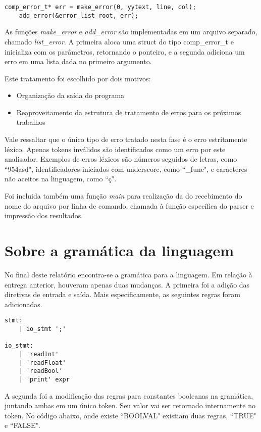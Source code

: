 \documentclass[11pt]{article}
\begin{document}
\begin{lstlisting}[basicstyle=\small]
    comp_error_t* err = make_error(0, yytext, line, col);
    add_error(&error_list_root, err);
\end{lstlisting}

As funções \emph{make\_error} e \emph{add\_error} são implementadas em um arquivo separado, chamado
\emph{list\_error}. A primeira aloca uma struct do tipo comp\_error\_t e inicializa com os parâmetros, retornando o ponteiro,
e a segunda adiciona um erro em uma lista dada no primeiro argumento.

Este tratamento foi escolhido por dois motivos:

\begin{itemize}[leftmargin=.5in]
  \item Organização da saída do programa
  \item Reaproveitamento da estrutura de tratamento de erros para os próximos trabalhos
\end{itemize}

Vale ressaltar que o único tipo de erro tratado nesta fase é o erro estritamente léxico. 
Apenas tokens inválidos são identificados como um erro por este analisador.
Exemplos de erros léxicos são números seguidos de letras, como ``954asd", identificadores iniciados com underscore, como ``\_func",
e caracteres não aceitos na linguagem, como ``ç".

Foi incluida também uma função \emph{main} para realização da do recebimento do nome do
arquivo por linha de comando, chamada à função específica do parser e impressão dos resultados.


\section{Sobre a gramática da linguagem}

No final deste relatório encontra-se a gramática para a linguagem. Em relação à entrega anterior, houveram apenas duas mudanças.
A primeira foi a adição das diretivas de entrada e saída. Mais especificamente, as seguintes regras foram adicionadas.


\begin{lstlisting}[basicstyle=\small]
stmt:
    | io_stmt ';'

io_stmt:
    | 'readInt'
    | 'readFloat'
    | 'readBool'
    | 'print' expr
\end{lstlisting}

A segunda foi a modificação das regras para constantes booleanas na gramática,
juntando ambas em um único token. Seu valor vai ser retornado internamente no token.
No código abaixo, onde existe ``BOOLVAL" existiam duas regras, ``TRUE" e ``FALSE".
\end{document}
